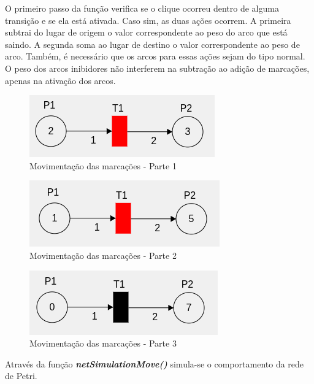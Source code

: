\documentclass[
	12pt,				%
	openright,			%
	oneside,			%
	a4paper,			%
	english,			%
	brazil				%
	]{abntex2}
\begin{document}
O primeiro passo da função verifica se o clique ocorreu dentro de alguma transição e se ela está ativada. Caso sim, as duas ações ocorrem. A primeira subtrai do lugar de origem o valor correspondente ao peso do arco que está saindo. A segunda soma ao lugar de destino o valor correspondente ao peso de arco. Também, é necessário que os arcos para essas ações sejam do tipo normal. O peso dos arcos inibidores não interferem na subtração ao adição de marcações, apenas na ativação dos arcos.

\begin{figure}[ht] 
	\centering
	\includegraphics[scale=0.8]{figuras/moveTokens1.png}
	\caption[Movimentando as marcações]{Movimentação das marcações - Parte 1}
	\label{fig:moveTokens1}
\end{figure}
\FloatBarrier

\begin{figure}[ht] 
	\centering
	\includegraphics[scale=0.8]{figuras/moveTokens2.png}
	\caption[Movimentando as marcações]{Movimentação das marcações - Parte 2}
	\label{fig:moveTokens2}
\end{figure}
\FloatBarrier

\begin{figure}[ht] 
	\centering
	\includegraphics[scale=0.8]{figuras/moveTokens3.png}
	\caption[Movimentando as marcações]{Movimentação das marcações - Parte 3}
	\label{fig:moveTokens3}
\end{figure}
\FloatBarrier

Através da função \textbf{\textit{netSimulationMove()}} simula-se o comportamento da rede de Petri.
\end{document}
